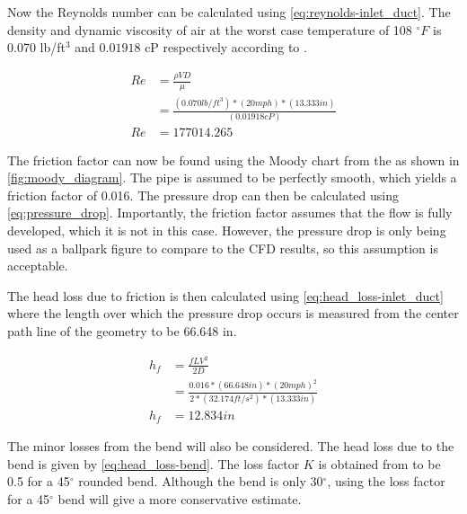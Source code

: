\documentclass{article}
\begin{document}
Now the Reynolds number can be calculated using \autoref{eq:reynolds-inlet_duct}. The density and dynamic viscosity of air at the worst case temperature of 108 $^\circ F$ is 0.070 lb/ft$^3$ and $0.01918$ cP respectively according to .

\begin{equation}
	\begin{aligned}
		Re & = \frac{\rho V D}{\mu}                                      \\
		   & = \frac{(0.070 lb/ft^3)*(20 mph)*(13.333 in)}{(0.01918 cP)} \\
		Re & = 177014.265
	\end{aligned}
	\label{eq:reynolds-inlet_duct}
\end{equation}

The friction factor can now be found using the Moody chart from the  as shown in \autoref{fig:moody_diagram}. The pipe is assumed to be perfectly smooth, which yields a friction factor of 0.016. The pressure drop can then be calculated using \autoref{eq:pressure_drop}. Importantly, the friction factor assumes that the flow is fully developed, which it is not in this case. However, the pressure drop is only being used as a ballpark figure to compare to the CFD results, so this assumption is acceptable.

The head loss due to friction is then calculated using \autoref{eq:head_loss-inlet_duct} where the length over which the pressure drop occurs is measured from the center path line of the geometry to be 66.648 in.

\begin{equation}
	\begin{aligned}
		h_f & = \frac{f L V^2}{2D}                                                 \\
		    & = \frac{0.016*(66.648 in)*(20 mph)^2}{2*(32.174 ft/s^2)*(13.333 in)} \\
		h_f & = 12.834 in
	\end{aligned}
	\label{eq:head_loss-inlet_duct}
\end{equation}

The minor losses from the bend will also be considered. The head loss due to the bend is given by \autoref{eq:head_loss-bend}. The loss factor $K$ is obtained from  to be 0.5 for a 45$^\circ$ rounded bend. Although the bend is only 30$^\circ$, using the loss factor for a 45$^\circ$ bend will give a more conservative estimate.
\end{document}
